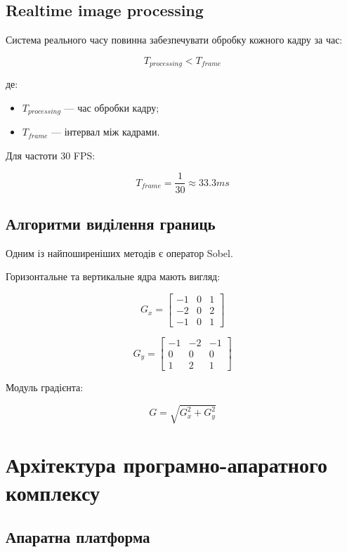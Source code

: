 \documentclass[14pt,a4paper]{extreport}
\begin{document}
\section{Realtime image processing}

Система реального часу повинна забезпечувати
обробку кожного кадру за час:

\[
T_{processing} < T_{frame}
\]

де:
\begin{itemize}
    \item $T_{processing}$ --- час обробки кадру;
    \item $T_{frame}$ --- інтервал між кадрами.
\end{itemize}

Для частоти 30 FPS:

\[
T_{frame} = \frac{1}{30} \approx 33.3 ms
\]

\section{Алгоритми виділення границь}

Одним із найпоширеніших методів є оператор Sobel.

Горизонтальне та вертикальне ядра мають вигляд:

\[
G_x =
\begin{bmatrix}
-1 & 0 & 1 \\
-2 & 0 & 2 \\
-1 & 0 & 1
\end{bmatrix}
\]

\[
G_y =
\begin{bmatrix}
-1 & -2 & -1 \\
0 & 0 & 0 \\
1 & 2 & 1
\end{bmatrix}
\]

Модуль градієнта:

\[
G = \sqrt{G_x^2 + G_y^2}
\]


\chapter{Архітектура програмно-апаратного комплексу}

\section{Апаратна платформа}
\end{document}
